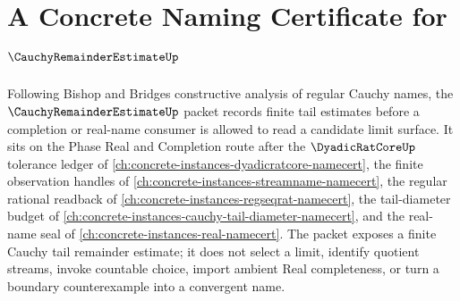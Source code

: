 \chapter{A Concrete Naming Certificate for $\CauchyRemainderEstimateUp$}
\label{ch:concrete-instances-cauchy-remainder-estimate-namecert}

Following Bishop and Bridges constructive analysis of regular Cauchy names, the $\CauchyRemainderEstimateUp$ packet records finite tail estimates before a completion or real-name consumer is allowed to read a candidate limit surface. It sits on the Phase Real and Completion route after the $\DyadicRatCoreUp$ tolerance ledger of \autoref{ch:concrete-instances-dyadicratcore-namecert}, the finite observation handles of \autoref{ch:concrete-instances-streamname-namecert}, the regular rational readback of \autoref{ch:concrete-instances-regseqrat-namecert}, the tail-diameter budget of \autoref{ch:concrete-instances-cauchy-tail-diameter-namecert}, and the real-name seal of \autoref{ch:concrete-instances-real-namecert}. The packet exposes a finite Cauchy tail remainder estimate; it does not select a limit, identify quotient streams, invoke countable choice, import ambient Real completeness, or turn a boundary counterexample into a convergent name.

